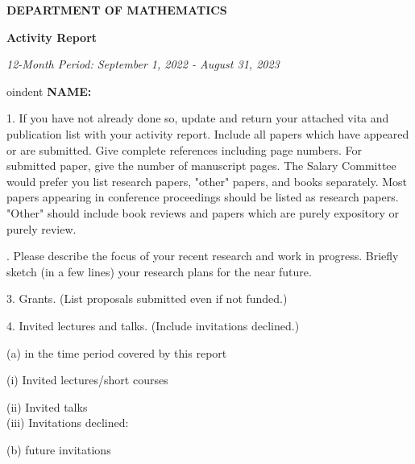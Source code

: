 \documentclass[oneside,12pt]{amsart}
\begin{document}
\begin{center}
\large \textbf {DEPARTMENT OF MATHEMATICS} \\
\bigskip

\textbf {Activity Report}
\bigskip

\large \textit {12-Month Period: September 1, 2022 - August 31, 2023}
\end{center}
\bigskip


oindent {\bf NAME:}
\bigskip

1. If you have not already done so, update and return your attached vita and publication
list with your activity report. Include all papers which have appeared or are submitted.
Give complete references including page numbers. For submitted paper, give the number
of manuscript pages. The Salary Committee would prefer you list research papers,
"other" papers, and books separately. Most papers appearing in conference proceedings
should be listed as research papers. "Other" should include book reviews and papers
which are purely expository or purely review.

. Please describe the focus of your recent research and work in progress. Briefly sketch (in a
few lines) your research plans for the near future.
\medskip


\bigskip
\bigskip
\bigskip
\bigskip
\bigskip
\bigskip
\bigskip
\bigskip
\bigskip
\bigskip
\bigskip
\bigskip
\bigskip
\bigskip

3. Grants. (List proposals submitted even if not funded.)
\bigskip
\bigskip
\bigskip
\bigskip
\bigskip
\bigskip
\bigskip
\bigskip

4. Invited lectures and talks. (Include invitations declined.)

\setlength{\parindent}{10ex}
(a) in the time period covered by this report
\bigskip

\setlength{\parindent}{20ex}
(i) Invited lectures/short courses \\

\bigskip
\bigskip
\bigskip
\bigskip
\bigskip
\bigskip

\setlength{\parindent}{30ex} 
(ii) Invited talks \\

\bigskip
\bigskip
\bigskip
\bigskip
\bigskip
\bigskip
\bigskip
\bigskip
\bigskip
\bigskip
\bigskip
\setlength{\parindent}{20ex}
(iii) Invitations declined: \\
\smallskip

\setlength{\parindent}{10ex}
(b) future invitations \\
\end{document}
